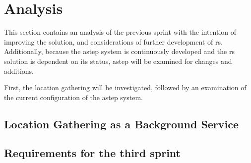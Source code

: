 \section{Analysis}
This section contains an analysis of the previous sprint with the intention of improving the solution, and considerations of further development of \gls{rs}.
Additionally, because the \gls{astep} system is continuously developed and the \gls{rs} solution is dependent on its status, \gls{astep} will be examined for changes and additions.

First, the location gathering will be investigated, followed by an examination of the current configuration of the \gls{astep} system.

\subsection{Location Gathering as a Background Service} \label{ssec:LocationGatherBGS}






\subsection{Requirements for the third sprint}
